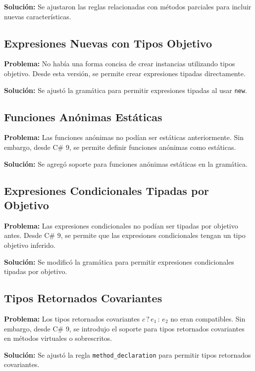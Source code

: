 \textbf{Solución:} Se ajustaron las reglas relacionadas con métodos parciales para incluir nuevas características.

\subsection*{Expresiones Nuevas con Tipos Objetivo}

\textbf{Problema:} No había una forma concisa de crear instancias utilizando tipos objetivo. Desde esta versión, se permite crear expresiones tipadas directamente.

\textbf{Solución:} Se ajustó la gramática para permitir expresiones tipadas al usar \texttt{new}.

\subsection*{Funciones Anónimas Estáticas}

\textbf{Problema:} Las funciones anónimas no podían ser estáticas anteriormente. Sin embargo, desde C\# 9, se permite definir funciones anónimas como estáticas.

\textbf{Solución:} Se agregó soporte para funciones anónimas estáticas en la gramática.

\subsection*{Expresiones Condicionales Tipadas por Objetivo}

\textbf{Problema:} Las expresiones condicionales no podían ser tipadas por objetivo antes. Desde C\# 9, se permite que las expresiones condicionales tengan un tipo objetivo inferido.

\textbf{Solución:} Se modificó la gramática para permitir expresiones condicionales tipadas por objetivo.

\subsection*{Tipos Retornados Covariantes}

\textbf{Problema:} Los tipos retornados covariantes \( c \, ? \, e_1 \, : \, e_2 \)
 no eran compatibles. Sin embargo, desde C\# 9, se introdujo el soporte para tipos retornados covariantes en métodos virtuales o sobrescritos.

\textbf{Solución:} Se ajustó la regla \texttt{method\_declaration} para permitir tipos retornados covariantes.

